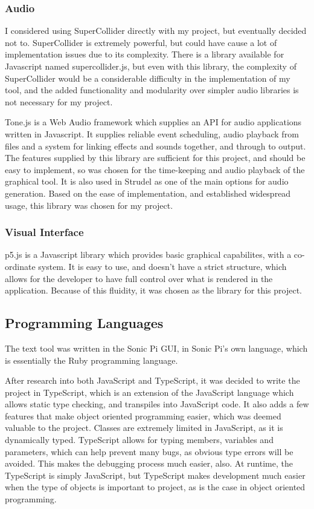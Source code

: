 \documentclass[12pt,a4paper,oneside,openright]{report}
\begin{document}
\subsubsection{Audio}
I considered using SuperCollider directly with my project, but eventually decided not to. SuperCollider is extremely powerful, but could have cause a lot of implementation issues due to its complexity. There is a library available for Javascript named supercollider.js, but even with this library, the complexity of SuperCollider would be a considerable difficulty in the implementation of my tool, and the added functionality and modularity over simpler audio libraries is not necessary for my project.

Tone.js is a Web Audio framework which supplies an API for audio applications written in Javascript. It supplies reliable event scheduling, audio playback from files and a system for linking effects and sounds together, and through to output. The features supplied by this library are sufficient for this project, and should be easy to implement, so was chosen for the time-keeping and audio playback of the graphical tool. It is also used in Strudel as one of the main options for audio generation. Based on the ease of implementation, and established widespread usage, this library was chosen for my project.

\subsubsection{Visual Interface}
p5.js is a Javascript library which provides basic graphical capabilites, with a co-ordinate system. It is easy to use, and doesn't have a strict structure, which allows for the developer to have full control over what is rendered in the application. Because of this fluidity, it was chosen as the library for this project.

\subsection{Programming Languages}
The text tool was written in the Sonic Pi GUI, in Sonic Pi's own language, which is essentially the Ruby programming language.

After research into both JavaScript and TypeScript, it was decided to write the project in TypeScript, which is an extension of the JavaScript language which allows static type checking, and transpiles into JavaScript code. It also adds a few features that make object oriented programming easier, which was deemed valuable to the project. Classes are extremely limited in JavaScript, as it is dynamically typed. TypeScript allows for typing members, variables and parameters, which can help prevent many bugs, as obvious type errors will be avoided. This makes the debugging process much easier, also. At runtime, the TypeScript is simply JavaScript, but TypeScript makes development much easier when the type of objects is important to project, as is the case in object oriented programming.
\end{document}
